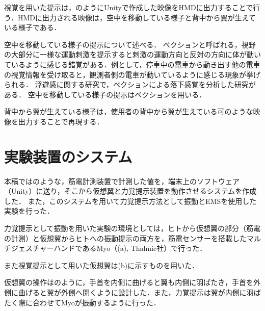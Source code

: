     視覚を用いた提示は，のようにUnityで作成した映像をHMDに出力することで行う．HMDに出力される映像は，空中を移動している様子と背中から翼が生えている様子である．

    空中を移動している様子の提示について述べる．
    ベクションと呼ばれる，視野の大部分に一様な運動刺激を提示すると刺激の運動方向と反対の方向に体が動いているように感じる錯覚がある\cite{妹尾武治2014ベクションとその周辺の近年の動向}．例として，停車中の電車から動き出す他の電車の視覚情報を受け取ると，観測者側の電車が動いているように感じる現象が挙げられる．
    浮遊感に関する研究で，ベクションによる落下感覚を分析した研究がある\cite{奥川夏輝2017VR空間における視覚刺激によって発生する落下感覚の分析}．
    空中を移動している様子の提示はベクションを用いる．

    背中から翼が生えている様子は，使用者の背中から翼が生えている可のような映像を出力することで再現する．  


    \section{実験装置のシステム}
    本稿ではのような，筋電計測装置で計測した値を，端末上のソフトウェア（Unity）に送り，そこから仮想翼と力覚提示装置を動作させるシステムを作成した．
    また，このシステムを用いて力覚提示方法として振動とEMSを使用した実験を行った．





    力覚提示として振動を用いた実験の環境としては，ヒトから仮想翼の部分（筋電の計測）と仮想翼からヒトへの振動提示の両方を，筋電センサーを搭載したマルチジェスチャーハンドであるMyo（(a), Thalmic社）で行った．

    また視覚提示として用いた仮想翼は(b)に示すものを用いた．

    仮想翼の操作はのように，手首を内側に曲げると翼も内側に羽ばたき，手首を外側に曲げると翼が外側へ開くように設計した．また，力覚提示は翼が内側に羽ばたく際に合わせてMyoが振動するように行った．

